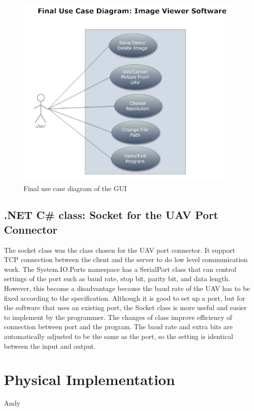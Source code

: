 \documentclass[oneside]{ecsgdp}         %
\begin{document}
\begin{figure}[!hbtp]
\begin{center}
\includegraphics[scale=0.7]{FinaluserCase.PNG} 
\end{center}
\caption{Final use case diagram of the GUI\label{GUI_finalUseCase}}
\end{figure}

\subsection{.NET C\# class: Socket for the UAV Port Connector}
The socket class was the class chosen for the UAV port connector. It support TCP connection between the client and the server to do low level communication work\cite{xiaX}. The System.IO.Ports namespace has a SerialPort class that can control settings of the port such as baud rate, stop bit, parity bit, and data length. However, this become a disadvantage because the baud rate of the UAV has to be fixed according to the specification. Although it is good to set up a port, but for the software that uses an existing port, the Socket class is more useful and easier to implement by the programmer. The changes of class improve efficiency of connection between port and the program. The baud rate and extra bits are automatically adjusted to be the same as the port, so the setting is identical between the input and output. 


\section{Physical Implementation}
Andy
\end{document}
